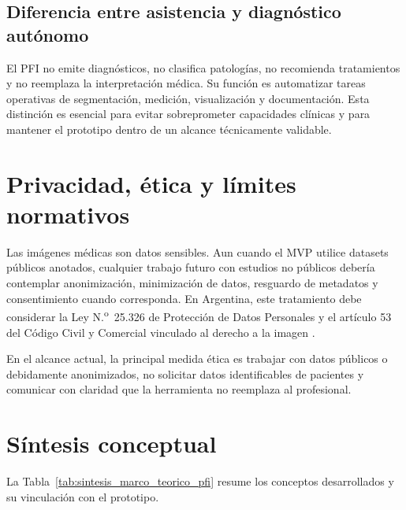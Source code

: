 \subsection{Diferencia entre asistencia y diagnóstico autónomo}

El PFI no emite diagnósticos, no clasifica patologías, no recomienda tratamientos y no reemplaza la interpretación médica. Su función es automatizar tareas operativas de segmentación, medición, visualización y documentación. Esta distinción es esencial para evitar sobreprometer capacidades clínicas y para mantener el prototipo dentro de un alcance técnicamente validable.

\section{Privacidad, ética y límites normativos}

Las imágenes médicas son datos sensibles. Aun cuando el MVP utilice datasets públicos anotados, cualquier trabajo futuro con estudios no públicos debería contemplar anonimización, minimización de datos, resguardo de metadatos y consentimiento cuando corresponda. En Argentina, este tratamiento debe considerar la Ley N.\textsuperscript{o}~25.326 de Protección de Datos Personales y el artículo 53 del Código Civil y Comercial vinculado al derecho a la imagen \parencite{argentina_ley_25326,argentina_codigo_civil_imagen}.

En el alcance actual, la principal medida ética es trabajar con datos públicos o debidamente anonimizados, no solicitar datos identificables de pacientes y comunicar con claridad que la herramienta no reemplaza al profesional.

\section{Síntesis conceptual}

La Tabla~\ref{tab:sintesis_marco_teorico_pfi} resume los conceptos desarrollados y su vinculación con el prototipo.

